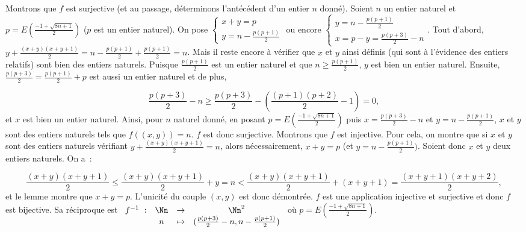 {{Montrons que $f$ est surjective (et au passage, déterminons l'antécédent d'un entier $n$ donné).
Soient $n$ un entier naturel et $p=E\left(\frac{-1+\sqrt{8n+1}}{2}\right)$ ($p$ est un entier naturel). On pose $\left\{
\begin{array}{l}
x+y=p\\
y=n-\frac{p(p+1)}{2}
\end{array}
\right.$ ou encore $\left\{
\begin{array}{l}
y=n-\frac{p(p+1)}{2}\\
x=p-y=\frac{p(p+3)}{2}-n
\end{array}
\right.$. Tout d'abord, $y+\frac{(x+y)(x+y+1)}{2}=n-\frac{p(p+1)}{2}+\frac{p(p+1)}{2}=n$. Mais il reste encore à
vérifier que $x$ et $y$ ainsi définis (qui sont à l'évidence des entiers relatifs) sont bien des entiers
naturels. Puisque $\frac{p(p+1)}{2}$ est un entier naturel et que $n\geq\frac{p(p+1)}{2}$, $y$ est bien un entier
naturel. Ensuite, $\frac{p(p+3)}{2}=\frac{p(p+1)}{2}+p$ est aussi un entier naturel et de plus,

$$\frac{p(p+3)}{2}-n\geq\frac{p(p+3)}{2}-\left(\frac{(p+1)(p+2)}{2}-1\right)=0,$$
et $x$ est bien un entier naturel. Ainsi, pour $n$ naturel donné, en posant $p= E\left(\frac{-1+\sqrt{8n+1}}{2}\right)$ puis
$x=\frac{p(p+3)}{2}-n$ et $y=n-\frac{p(p+1)}{2}$, $x$ et $y$ sont des entiers naturels tels que $f((x,y))=n$. $f$ est
donc surjective.
Montrons que $f$ est injective.
Pour cela, on montre que si $x$ et $y$ sont des entiers naturels vérifiant
$y+\frac{(x+y)(x+y+1)}{2}=n$, alors nécessairement, $x+y=p$ (et $y=n-\frac{p(p+1)}{2})$.
Soient donc $x$ et $y$ deux entiers naturels. On a~:

$$\frac{(x+y)(x+y+1)}{2}\leq\frac{(x+y)(x+y+1)}{2}+y=n<\frac{(x+y)(x+y+1)}{2}+(x+y+1)=\frac{(x+y+1)(x+y+2)}{2},$$
et le lemme montre que $x+y=p$. L'unicité du couple $(x,y)$ est donc démontrée. $f$ est une application injective et
surjective et donc $f$ est bijective. Sa réciproque est $\begin{array}[t]{cccc}
f^{-1}~:&\Nn&\rightarrow&\Nn^2\\
 &n&\mapsto&(\frac{p(p+3)}{2}-n,n-\frac{p(p+1)}{2})
\end{array}$ où $p=E\left(\frac{-1+\sqrt{8n+1}}{2}\right)$.
}
}
